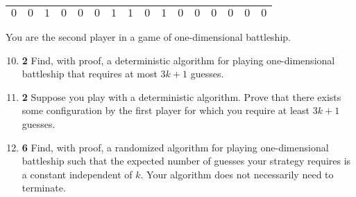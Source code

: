 \documentclass[12pt]{article}
\theoremstyle{plain}
\theoremstyle{definition}
\theoremstyle{remark}
\newcommand{\E}{\textbf{E}}
\newcommand{\pts}[1]{\lbrack\textbf{#1}\rbrack}
\begin{document}
\begin{center}
\begin{tabular}{|c|c|c|c|c|c|c|c|c|c|c|c|c|c|c|c|}
\hline
$0$ & $0$ & $1$ & $0$ & $0$ & $0$ & $1$ & $1$ & $0$ & $1$ & $0$ & $0$ & $0$ & $0$ & $0$ & $0$ \\
\hline
\end{tabular}
\end{center}

You are the second player in a game of one-dimensional battleship.

\begin{enumerate}
\setcounter{enumi}{9}

\item \pts{2} Find, with proof, a deterministic algorithm for playing one-dimensional battleship that requires at most $3k+1$ guesses.

\begin{comment}\begin{tcolorbox}
Iteratively guess $A[1],A[2],\dots$. If $A[1]=\dots=A[3k]=0$ fail then $A[3k+1]=1$.
\end{tcolorbox}\end{comment}

\item \pts{2} Suppose you play with a deterministic algorithm. Prove that there exists some configuration by the first player for which you require at least $3k+1$ guesses.

\begin{comment}\begin{tcolorbox}
All deterministic algorithms can be characterized by a fixed sequence of guesses $\sigma:\mathbb{N}\to(1,2,\dots,4k)$, iteratively guessing $A[\sigma(1)],A[\sigma(2)],\dots$. Since there are $3k$ $0$s among $A[1],\dots,A[4k]$, there exists some configuration such that $A[\sigma(1)]=A[\sigma(2)]=\dots=A[\sigma(3k)]=0$.
\end{tcolorbox}\end{comment}

\item \pts{6} Find, with proof, a randomized algorithm for playing one-dimensional battleship such that the expected number of guesses your strategy requires is a constant independent of $k$. Your algorithm does not necessarily need to terminate.

\begin{comment}\begin{tcolorbox}
On the $i$th guess, let $X_i=\textbf{D}(4k)$ and guess $A[X_i]$. Let $Y_i$ be the random variable that is $1$ if $A[X_i]=1$ and $0$ otherwise, and let $Z$ be the random variable corresponding to the number of guesses in this strategy. Since $Y_i\sim\text{Bernoulli}(0.25)$, we have $Z\sim\text{Geometric}(0.25)$, so $\E[Z]=4$ by Problem 1.
\end{tcolorbox}\end{comment}
\end{enumerate}
\end{document}

